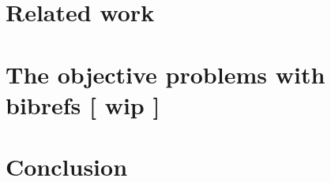 \documentclass[twoside,11pt,openright,a4paper]{report}
\newcommand{\remark}[1]{{ \bf [ \footnotesize #1 ]}}
\begin{document}


\chapter{Related work}
\label{ch:related}



\chapter{The objective problems with bibrefs \remark{wip}}
\label{ch:problem-description}





\chapter{Conclusion}
\label{ch:conclusion}

\todo{\dots}


\printbibliography{}
\end{document}
